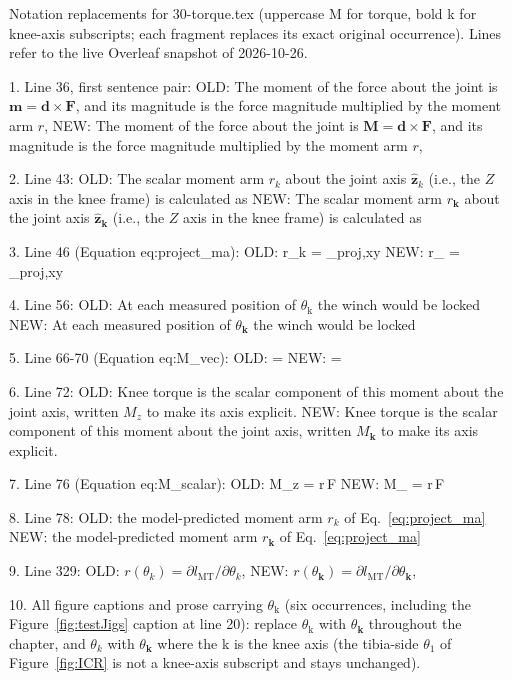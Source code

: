 Notation replacements for 30-torque.tex (uppercase M for torque, bold k for knee-axis subscripts; each fragment replaces its exact original occurrence). Lines refer to the live Overleaf snapshot of 2026-10-26.

1. Line 36, first sentence pair:
OLD: The moment of the force about the joint is $\mathbf{m} = \mathbf{d} \times \mathbf{F}$, and its magnitude is the force magnitude multiplied by the moment arm $r$,
NEW: The moment of the force about the joint is $\mathbf{M} = \mathbf{d} \times \mathbf{F}$, and its magnitude is the force magnitude multiplied by the moment arm $r$,

2. Line 43:
OLD: The scalar moment arm $r_{k}$ about the joint axis $\hat{\mathbf{z}}_{k}$ (i.e., the $Z$ axis in the knee frame) is calculated as
NEW: The scalar moment arm $r_{\mathbf{k}}$ about the joint axis $\hat{\mathbf{z}}_{\mathbf{k}}$ (i.e., the $Z$ axis in the knee frame) is calculated as

3. Line 46 (Equation eq:project_ma):
OLD:     r_{k} = _{proj,xy} \cdot {} {  }
NEW:     r_{} = _{proj,xy} \cdot {}

4. Line 56:
OLD: At each measured position of $\theta_\text{k}$ the winch would be locked
NEW: At each measured position of $\theta_{\mathbf{k}}$ the winch would be locked

5. Line 66-70 (Equation eq:M_vec):
OLD:      =  \times {} \label{eq:M_vec}
NEW:      =  \times {} \label{eq:M_vec}

6. Line 72:
OLD: Knee torque is the scalar component of this moment about the joint axis, written $M_{z}$ to make its axis explicit.
NEW: Knee torque is the scalar component of this moment about the joint axis, written $M_{\mathbf{k}}$ to make its axis explicit.

7. Line 76 (Equation eq:M_scalar):
OLD:     M_{z} = r\,F \label{eq:M_scalar}
NEW:     M_{} = r\,F \label{eq:M_scalar}

8. Line 78:
OLD: the model-predicted moment arm $r_{k}$ of Eq.~\eqref{eq:project_ma}
NEW: the model-predicted moment arm $r_{\mathbf{k}}$ of Eq.~\eqref{eq:project_ma}

9. Line 329:
OLD: $r(\theta_{k}) = \partial l_{\mathrm{MT}}/\partial\theta_{k}$,
NEW: $r(\theta_{\mathbf{k}}) = \partial l_{\mathrm{MT}}/\partial\theta_{\mathbf{k}}$,

10. All figure captions and prose carrying $\theta_\text{k}$ (six occurrences, including the Figure~\ref{fig:testJigs} caption at line 20): replace $\theta_\text{k}$ with $\theta_{\mathbf{k}}$ throughout the chapter, and $\theta_{k}$ with $\theta_{\mathbf{k}}$ where the k is the knee axis (the tibia-side $\theta_{1}$ of Figure~\ref{fig:ICR} is not a knee-axis subscript and stays unchanged).
